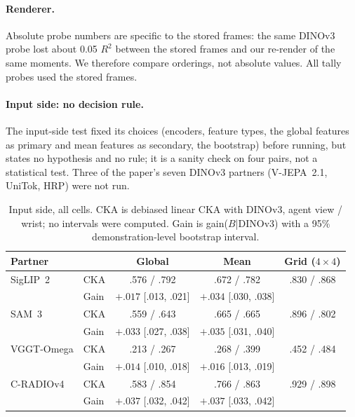 \paragraph{Renderer.}
Absolute probe numbers are specific to the stored frames: the same DINOv3 probe lost about 0.05 $R^2$ between the stored frames and our re-render of the same moments.
We therefore compare orderings, not absolute values.
All tally probes used the stored frames.

\paragraph{Input side: no decision rule.}
The input-side test fixed its choices (encoders, feature types, the global features as primary and mean features as secondary, the bootstrap) before running, but states no hypothesis and no rule; it is a sanity check on four pairs, not a statistical test.
Three of the paper's seven DINOv3 partners (V-JEPA~2.1, UniTok, HRP) were not run.

\begin{table}[t]
\centering
\small
\caption{Input side, all cells. CKA is debiased linear CKA with DINOv3, agent view / wrist; no intervals were computed. Gain is gain($B$|DINOv3) with a 95\% demonstration-level bootstrap interval.}
\label{tab:suppl-input}
\begin{tabular}{@{}llccc@{}}
\toprule
Partner & & Global & Mean & Grid ($4{\times}4$) \\
\midrule
SigLIP~2 & CKA & .576 / .792 & .672 / .782 & .830 / .868 \\
 & Gain & $+.017$ [.013, .021] & $+.034$ [.030, .038] & \\
SAM~3 & CKA & .559 / .643 & .665 / .665 & .896 / .802 \\
 & Gain & $+.033$ [.027, .038] & $+.035$ [.031, .040] & \\
VGGT-Omega & CKA & .213 / .267 & .268 / .399 & .452 / .484 \\
 & Gain & $+.014$ [.010, .018] & $+.016$ [.013, .019] & \\
C-RADIOv4 & CKA & .583 / .854 & .766 / .863 & .929 / .898 \\
 & Gain & $+.037$ [.032, .042] & $+.037$ [.033, .042] & \\
\bottomrule
\end{tabular}
\end{table}

